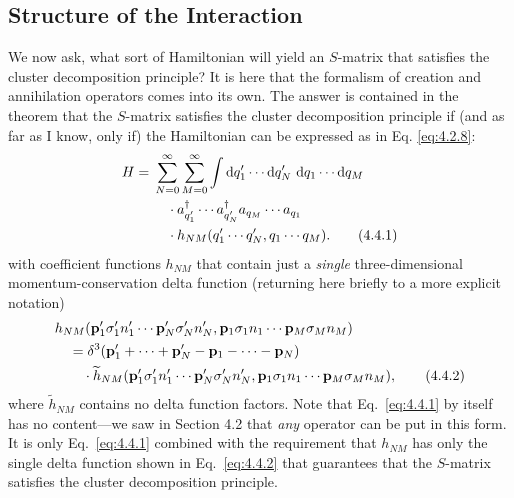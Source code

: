 
\subsection{Structure of the Interaction}

We now ask, what sort of Hamiltonian will yield an $S$-matrix that satisfies the
cluster decomposition principle? It is here that the formalism of creation and
annihilation operators comes into its own. The answer is contained in the
theorem that the $S$-matrix satisfies the cluster decomposition principle if
(and as far as I know, only if) the Hamiltonian can be expressed as in Eq.
\eqref{eq:4.2.8}:
\begin{align}
H={}&\sum_{N=0}^{\infty}\sum_{M=0}^{\infty}
 \int \mathop{}\!\mathrm{d} q'_1\cdots \mathop{}\!\mathrm{d} q'_N\,\mathop{}\!\mathrm{d} q_1\cdots \mathop{}\!\mathrm{d} q_M \notag\\
&\quad\cdot a^\dagger_{q'_1}\cdots a^\dagger_{q'_N}
 a_{q_M}\cdots a_{q_1} \notag\\
&\quad\cdot h_{NM}(q'_1\cdots q'_N,q_1\cdots q_M).
\tag{4.4.1}
\label{eq:4.4.1}
\end{align}
with coefficient functions $h_{NM}$ that contain just a \emph{single}
three-dimensional momentum-conservation delta function (returning here briefly
to a more explicit notation)
\begin{align}
&h_{NM}(\mathbf{p}'_1\sigma'_1 n'_1\cdots
 \mathbf{p}'_N\sigma'_N n'_N,
 \mathbf{p}_1\sigma_1 n_1\cdots \mathbf{p}_M\sigma_M n_M)
 \notag\\
&\quad={}
 \delta^3(\mathbf{p}'_1+\cdots+\mathbf{p}'_N
 -\mathbf{p}_1-\cdots-\mathbf{p}_N) \notag\\
&\qquad\cdot
 \widetilde h_{NM}(\mathbf{p}'_1\sigma'_1 n'_1\cdots
 \mathbf{p}'_N\sigma'_N n'_N,
 \mathbf{p}_1\sigma_1 n_1\cdots \mathbf{p}_M\sigma_M n_M),
\tag{4.4.2}
\label{eq:4.4.2}
\end{align}
where $\widetilde h_{NM}$ contains no delta function factors. Note that
Eq.~\eqref{eq:4.4.1} by itself has no content---we saw in Section 4.2 that \emph{any}
operator can be put in this form. It is only Eq.~\eqref{eq:4.4.1} combined with the
requirement that $h_{NM}$ has only the single delta function shown in
Eq.~\eqref{eq:4.4.2} that guarantees that the $S$-matrix satisfies the cluster decomposition
principle.

